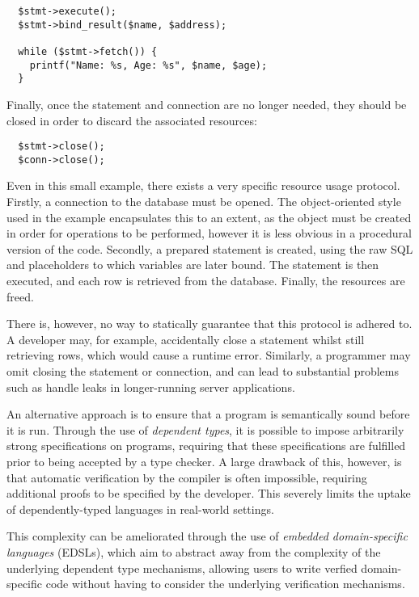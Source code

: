 \documentclass[preprint]{sigplanconf}
\begin{document}
{\small
\begin{verbatim}
  $stmt->execute();
  $stmt->bind_result($name, $address);

  while ($stmt->fetch()) {
    printf("Name: %s, Age: %s", $name, $age);
  }
\end{verbatim}
}

Finally, once the statement and connection are no longer needed, they should be closed in order to discard the associated resources:

{\small
\begin{verbatim}
  $stmt->close();
  $conn->close();
\end{verbatim}
}

Even in this small example, there exists a very specific resource usage protocol. Firstly, a connection to the database must be opened. The object-oriented style used in the example encapsulates this to an extent, as the object must be created in order for operations to be performed, however it is less obvious in a procedural version of the code. Secondly, a prepared statement is created, using the raw SQL and placeholders to which variables are later bound. The statement is then executed, and each row is retrieved from the database. Finally, the resources are freed. 

There is, however, no way to statically guarantee that this protocol is adhered to. A developer may, for example, accidentally close a statement whilst still retrieving rows, which would cause a runtime error. Similarly, a programmer may omit closing the statement or connection, and can lead to substantial problems such as handle leaks in longer-running server applications.

An alternative approach is to ensure that a program is semantically sound before it is run. Through the use of \textit{dependent types}, it is possible to impose arbitrarily strong specifications on programs, requiring that these specifications are fulfilled prior to being accepted by a type checker. A large drawback of this, however, is that automatic verification by the compiler is often impossible, requiring additional proofs to be specified by the developer. This severely limits the uptake of dependently-typed languages in real-world settings.

This complexity can be ameliorated through the use of \textit{embedded domain-specific languages} (EDSLs), which aim to abstract away from the complexity of the underlying dependent type mechanisms, allowing users to write verfied domain-specific code without having to consider the underlying verification mechanisms.   %
\end{document}
